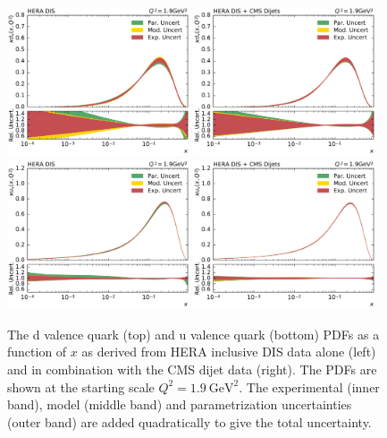 \begin{figure}[tbp]
  \centering
  \includegraphics[width=0.48\textwidth]{figures/pdf_constraints/pdfcomp_HFTD_HERA_7_1.9.pdf}\hfill%
  \includegraphics[width=0.48\textwidth]{figures/pdf_constraints/pdfcomp_HFTD_HERACMSTDJETS_7_1.9.pdf}
  \includegraphics[width=0.48\textwidth]{figures/pdf_constraints/pdfcomp_HFTD_HERA_8_1.9.pdf}\hfill%
  \includegraphics[width=0.48\textwidth]{figures/pdf_constraints/pdfcomp_HFTD_HERACMSTDJETS_8_1.9.pdf}

  \caption[The d valence and u valence quark PDFs]{The d valence quark (top) and u
    valence quark (bottom) PDFs as a function of $x$ as
  derived from HERA inclusive DIS data alone (left) and in combination with
  the CMS dijet data (right). The PDFs are shown at the starting scale $Q^2 =
  \SI{1.9}{\GeV \squared}$. The experimental (inner band), model (middle band)
  and parametrization uncertainties (outer band) are added quadratically to give
  the total uncertainty.}
  \label{fig:pdfconstraints:split:dvaluval:19}
\end{figure}




